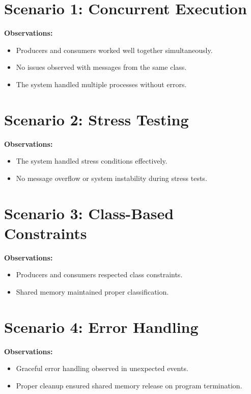 \section{Scenario 1: Concurrent Execution}

\textbf{Observations:}
\begin{itemize}
    \item Producers and consumers worked well together simultaneously.
    \item No issues observed with messages from the same class.
    \item The system handled multiple processes without errors.
\end{itemize}

\section{Scenario 2: Stress Testing}

\textbf{Observations:}
\begin{itemize}
    \item The system handled stress conditions effectively.
    \item No message overflow or system instability during stress tests.
\end{itemize}

\section{Scenario 3: Class-Based Constraints}

\textbf{Observations:}
\begin{itemize}
    \item Producers and consumers respected class constraints.
    \item Shared memory maintained proper classification.
\end{itemize}

\section{Scenario 4: Error Handling}

\textbf{Observations:}
\begin{itemize}
    \item Graceful error handling observed in unexpected events.
    \item Proper cleanup ensured shared memory release on program termination.
\end{itemize}